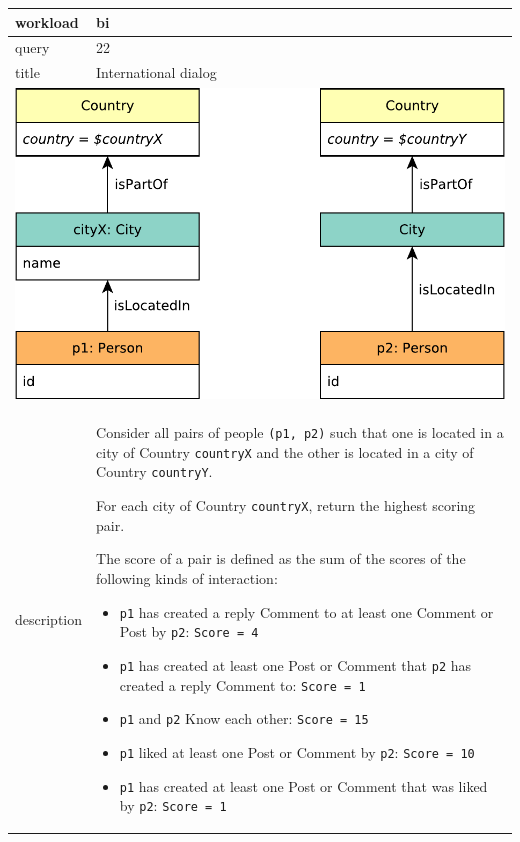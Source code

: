 \renewcommand*{\arraystretch}{1.1}

\noindent\begin{tabularx}{17cm}{|p{1.95cm}|X|}
	\hline
	workload    & bi \\ \hline
%
	query       & 22 \\ \hline
%
	title       & International dialog \\ \hline
	\multicolumn{2}{|c|}{ \includegraphics[scale=\patternscale,margin=0cm .2cm]{patterns/bi22}} \\ \hline
	description & Consider all pairs of people \texttt{(p1,\ p2)} such that one is located
in a city of Country \texttt{countryX} and the other is located in a
city of Country \texttt{countryY}.

For each city of Country \texttt{countryX}, return the highest scoring
pair.

The score of a pair is defined as the sum of the scores of the following
kinds of interaction:

\begin{itemize}
\tightlist
\item
  \texttt{p1} has created a reply Comment to at least one Comment or
  Post by \texttt{p2}: \texttt{Score\ =\ 4}
\item
  \texttt{p1} has created at least one Post or Comment that \texttt{p2}
  has created a reply Comment to: \texttt{Score\ =\ 1}
\item
  \texttt{p1} and \texttt{p2} Know each other: \texttt{Score\ =\ 15}
\item
  \texttt{p1} liked at least one Post or Comment by \texttt{p2}:
  \texttt{Score\ =\ 10}
\item
  \texttt{p1} has created at least one Post or Comment that was liked by
  \texttt{p2}: \texttt{Score\ =\ 1}
\end{itemize}


\end{tabularx}
